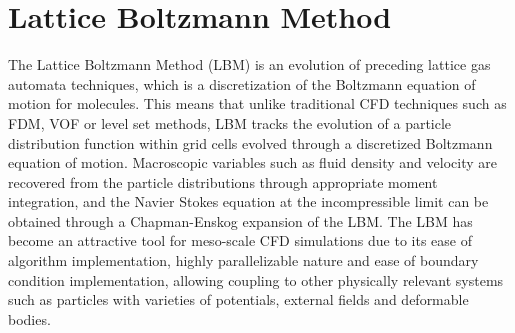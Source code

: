 



\section{Lattice Boltzmann Method}

The Lattice Boltzmann Method (LBM) is an evolution of preceding lattice gas automata techniques, which is a discretization of the Boltzmann equation of motion for 
molecules. This means that unlike traditional CFD techniques such as FDM, VOF or level set methods, LBM tracks the evolution of a 
particle distribution function within grid cells evolved through a discretized Boltzmann equation of motion. Macroscopic variables such as fluid density and 
velocity are recovered from the particle distributions through appropriate moment integration, and the Navier Stokes equation at the incompressible limit can be 
obtained through a Chapman-Enskog expansion of the LBM. The LBM has become an attractive tool for meso-scale CFD simulations due to its ease of algorithm 
implementation, highly parallelizable nature and ease of boundary condition implementation, allowing coupling to other physically relevant systems such as 
particles with varieties of potentials, external fields and deformable bodies.

